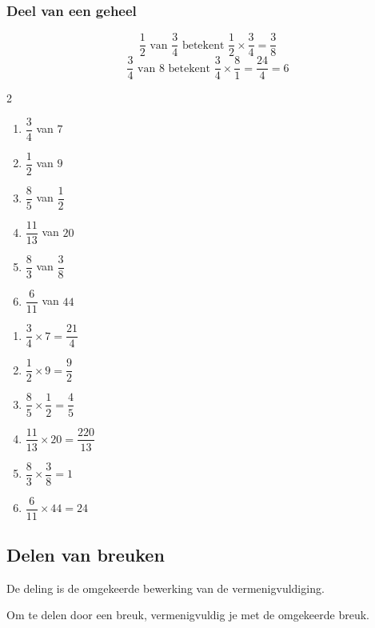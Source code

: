 \documentclass{bis}
\begin{document}
\subsubsection{Deel van een geheel}

\[\dfrac{1}{2}\text{ van }\dfrac{3}{4}\text{ betekent }\dfrac{1}{2}\times\dfrac{3}{4}=\dfrac{3}{8}\]
\[\dfrac{3}{4}\text{ van }8\text{ betekent }\dfrac{3}{4}\times\dfrac{8}{1}=\dfrac{24}{4}=6\]

\begin{exercise}
\begin{multicols}{2}
  \begin{enumerate}
    \item $\dfrac{3}{4}$ van $7$
    \item $\dfrac{1}{2}$ van $9$
    \item $\dfrac{8}{5}$ van $\dfrac{1}{2}$
    \item $\dfrac{11}{13}$ van $20$
    \item $\dfrac{8}{3}$ van $\dfrac{3}{8}$
    \item $\dfrac{6}{11}$ van $44$
  \end{enumerate}
\end{multicols}
\end{exercise}

\begin{solution}
  \begin{enumerate}
    \item $\dfrac{3}{4}\times 7=\dfrac{21}{4}$
    \item $\dfrac{1}{2}\times 9=\dfrac{9}{2}$
    \item $\dfrac{8}{5}\times\dfrac{1}{2}=\dfrac{4}{5}$
    \item $\dfrac{11}{13}\times 20=\dfrac{220}{13}$
    \item $\dfrac{8}{3}\times\dfrac{3}{8}=1$
    \item $\dfrac{6}{11}\times 44=24$
  \end{enumerate}
\end{solution}

\subsection{Delen van breuken}

De deling is de omgekeerde bewerking van de vermenigvuldiging.

\begin{onthoud}
Om te delen door een breuk, vermenigvuldig je met de omgekeerde breuk.
\end{onthoud}
\end{document}
